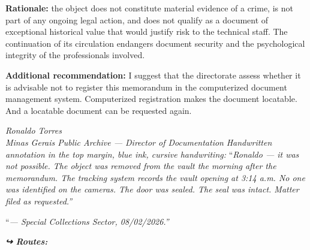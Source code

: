 \noindent \textbf{Rationale:} the object does not constitute material evidence of a crime, is not part of any ongoing legal action, and does not qualify as a document of exceptional historical value that would justify risk to the technical staff. The continuation of its circulation endangers document security and the psychological integrity of the professionals involved.

\noindent \textbf{Additional recommendation:} I suggest that the directorate assess whether it is advisable not to register this memorandum in the computerized document management system. Computerized registration makes the document locatable. And a locatable document can be requested again.

\noindent \textit{Ronaldo Torres}\\
\noindent \textit{Minas Gerais Public Archive --- Director of Documentation}
\noindent \textit{Handwritten annotation in the top margin, blue ink, cursive handwriting:}
\noindent \textquotedblleft{}\textit{Ronaldo --- it was not possible. The object was removed from the vault the morning after the memorandum. The tracking system records the vault opening at 3:14 a.m. No one was identified on the cameras. The door was sealed. The seal was intact. Matter filed as requested.\textquotedblright{}}

\noindent \textquotedblleft{}\textit{--- Special Collections Sector, 08/02/2026.\textquotedblright{}}

\vspace{0.5em}
\noindent\textit{\textbf{↪ Routes:}  \rotasep {} \rotasep {}}
